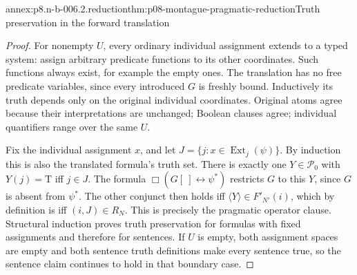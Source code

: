 \begin{annexitem}{annex:p8.n-b-006.2.reduction}{thm:p08-montague-pragmatic-reduction}{Truth preservation in the forward translation}
\begin{proof}
For nonempty \(U\), every ordinary individual assignment extends to a
typed system: assign arbitrary predicate functions to its other
coordinates. Such functions always exist, for example the empty ones.
The translation has no free predicate variables, since every introduced
\(G\) is freshly bound. Inductively its truth depends only on the
original individual coordinates. Original atoms agree because their
interpretations are unchanged; Boolean clauses agree; individual
quantifiers range over the same \(U\).

Fix the individual assignment \(x\), and let
\(J=\{j:x\in\operatorname{Ext}_{j}(\psi)\}\). By induction this
is also the translated formula's truth set. There is exactly one
\(Y\in\mathcal P_0\) with \(Y(j)=\mathrm T\) iff \(j\in J\).
The formula \(\Box(G[\ ]\leftrightarrow\psi^*)\) restricts
\(G\) to this \(Y\), since \(G\) is absent from \(\psi^*\).
The other conjunct then holds iff \(\langle Y\rangle\in F'_{N'}(i)\), which by
definition is iff \((i,J)\in R_N\). This is precisely the pragmatic
operator clause. Structural induction proves truth preservation for
formulas with fixed assignments and therefore for sentences. If
\(U\) is empty, both assignment spaces are empty and both sentence
truth definitions make every sentence true, so the sentence claim
continues to hold in that boundary case.
\end{proof}
\end{annexitem}

